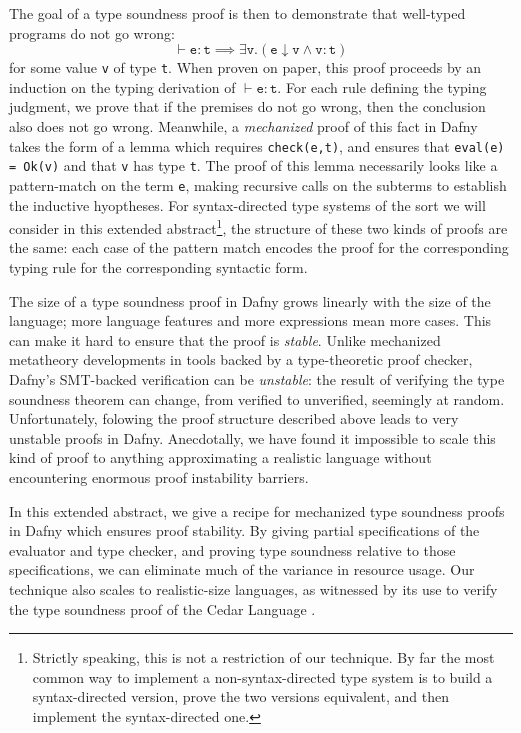 \documentclass[sigplan,review,screen,anonymous]{acmart}
\newcommand{\comm}[3]{\textcolor{#1}{[#2: #3]}}
\newcommand{\jwc}[1]{\comm{dkgreen}{JWC}{#1}}
\begin{document}
The goal of a type soundness proof is then to demonstrate that well-typed
programs do not go wrong:
$$\vdash \texttt{e} : \texttt{t} \implies \exists \texttt{v}. \left(\texttt{e} \downarrow \texttt{v} \wedge \texttt{v} : \texttt{t}\right)$$
for some value \texttt{v} of type \texttt{t}. When proven
on paper, this proof proceeds by an induction on the typing derivation of
$\vdash \texttt{e} : \texttt{t}$. For each rule defining the typing judgment, we
prove that if the premises do not go wrong, then the conclusion also does not go
wrong. Meanwhile, a \emph{mechanized} proof of this fact in Dafny takes the form
of a lemma which requires \texttt{check(e,t)}, and ensures that \texttt{eval(e)
= Ok(v)} and that \texttt{v} has type \texttt{t}. The proof of this lemma
necessarily looks like a pattern-match on the term \texttt{e}, making recursive
calls on the subterms to establish the inductive hyoptheses. For syntax-directed type systems
of the sort we will consider in this extended abstract\footnote{Strictly speaking, this is not a restriction of our technique. By far the most common way to implement a non-syntax-directed type system is to build a syntax-directed version, prove the two versions equivalent, and then implement the syntax-directed one.},
the structure of these two kinds of proofs are the same: each case of the pattern match encodes the proof for the corresponding typing rule for the corresponding syntactic form.

The size of a type soundness proof in Dafny grows linearly with the
size of the language; more language features and more expressions mean more
cases.  This can make it hard to ensure that the proof is \emph{stable}.  Unlike
mechanized metatheory developments in tools backed by a type-theoretic proof
checker, Dafny's SMT-backed verification can be \emph{unstable}: the result of
verifying the type soundness theorem can change, from verified to unverified, seemingly at random. 
Unfortunately, folowing the proof structure described above leads to very unstable proofs in Dafny. Anecdotally, we have
found it impossible to scale this kind of proof to anything approximating a realistic language without encountering enormous
proof instability barriers.

In this extended abstract, we give a recipe for mechanized type soundness proofs
in Dafny which ensures proof stability.  By giving partial specifications of the
evaluator and type checker, and proving type soundness relative to those
specifications, we can eliminate much of the variance in resource usage.  Our
technique also scales to realistic-size languages, as witnessed by its use to
verify the type soundness proof of the Cedar Language \cite{cedar}.
\end{document}
